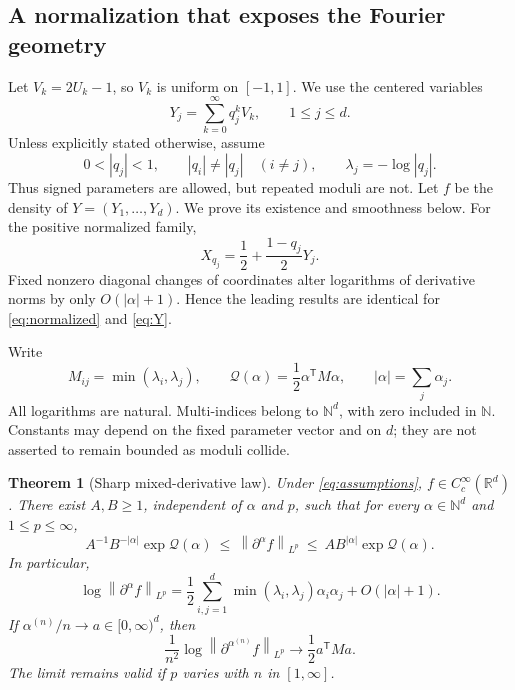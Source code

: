 \documentclass[11pt,a4paper]{article}
\numberwithin{equation}{section}
\newtheorem{theorem}{Theorem}[section]
\theoremstyle{definition}
\theoremstyle{remark}\newtheorem{remark}[theorem]{Remark}
\newcommand{\R}{\mathbb R}\newcommand{\N}{\mathbb N}
\newcommand{\Qf}{\mathcal Q}
\newcommand{\norm}[1]{\left\lVert #1\right\rVert}
\begin{document}
\subsection{A normalization that exposes the Fourier geometry}

Let $V_k=2U_k-1$, so $V_k$ is uniform on $[-1,1]$. We use the centered variables
\begin{equation}
 Y_j=\sum_{k=0}^{\infty}q_j^kV_k,\qquad 1\le j\le d.
 \label{eq:Y}
\end{equation}
Unless explicitly stated otherwise, assume
\begin{equation}
 0<|q_j|<1,\qquad |q_i|\ne|q_j|\quad(i\ne j),\qquad
 \lambda_j=-\log|q_j|.
 \label{eq:assumptions}
\end{equation}
Thus signed parameters are allowed, but repeated moduli are not. Let $f$ be
the density of $Y=(Y_1,\ldots,Y_d)$. We prove its existence and smoothness below.
For the positive normalized family,
\begin{equation}
 X_{q_j}=\frac12+\frac{1-q_j}{2}Y_j.
 \label{eq:scale}
\end{equation}
Fixed nonzero diagonal changes of coordinates alter logarithms of derivative
norms by only $O(|\alpha|+1)$. Hence the leading results are identical for
\eqref{eq:normalized} and \eqref{eq:Y}.

Write
\begin{equation}
 M_{ij}=\min(\lambda_i,\lambda_j),\qquad
 \Qf(\alpha)=\frac12\alpha^{\mathsf T}M\alpha,
 \qquad |\alpha|=\sum_j\alpha_j.
 \label{eq:MQ}
\end{equation}
All logarithms are natural. Multi-indices belong to $\N^d$, with zero included
in $\N$. Constants may depend on the fixed parameter vector and on $d$; they
are not asserted to remain bounded as moduli collide.

\begin{theorem}[Sharp mixed-derivative law]
\label{thm:main}
Under \eqref{eq:assumptions}, $f\in C_c^\infty(\R^d)$. There exist $A,B\ge1$,
independent of $\alpha$ and $p$, such that for every $\alpha\in\N^d$ and
$1\le p\le\infty$,
\begin{equation}
 A^{-1}B^{-|\alpha|}\exp\Qf(\alpha)
 \ \le\ \norm{\partial^\alpha f}_{L^p}
 \ \le\ AB^{|\alpha|}\exp\Qf(\alpha).
 \label{eq:main-bounds}
\end{equation}
In particular,
\begin{equation}
 \boxed{\log\norm{\partial^\alpha f}_{L^p}
       =\frac12\sum_{i,j=1}^d
        \min(\lambda_i,\lambda_j)\alpha_i\alpha_j+O(|\alpha|+1).}
 \label{eq:main-log}
\end{equation}
If $\alpha^{(n)}/n\to a\in[0,\infty)^d$, then
\begin{equation}
 \frac1{n^2}\log\norm{\partial^{\alpha^{(n)}}f}_{L^p}
 \longrightarrow\frac12a^{\mathsf T}Ma.
 \label{eq:direction-alpha}
\end{equation}
The limit remains valid if $p$ varies with $n$ in $[1,\infty]$.
\end{theorem}
\end{document}
